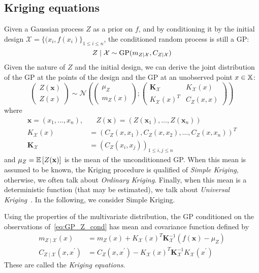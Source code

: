\documentclass[../../Main_ManuscritThese.tex]{subfiles}
\begin{document}
\subsection{Kriging equations}
\label{sec:linear_estimation}
Given a Gaussian process $Z$ as a prior on $f$, and by conditioning it by the initial design $\mathcal{X} = \{(x_i, f(x_i)\}_{1 \leq i \leq n}$, the conditioned random process is still a GP:
\begin{equation}
  \label{eq:GP_Z_cond}
  Z \mid \mathcal{X} \sim \operatorname{\mathrm{GP}}(m_{Z\mid \mathcal{X}}, C_{Z\mid \mathcal{X}})
\end{equation}
Given the nature of $Z$ and the initial design, we can derive the joint distribution of the GP at the points of the design and the GP at an unobserved point $x \in \mathbb{X}$:
\begin{equation}
  \label{eq:GP_joint_distrib}
  \begin{pmatrix}
    Z(\mathbf{x}) \\
    Z(x)
  \end{pmatrix} \sim
  \mathcal{N}\left(
    \begin{pmatrix}
      \mu_Z \\
      m_{Z}(x)
    \end{pmatrix} ;
    \begin{pmatrix}
      \mathbf{K}_{\mathcal{X}} & K_{\mathcal{X}}(x) \\
       K_{\mathcal{X}}(x)^T & C_Z(x, x)
    \end{pmatrix}
\right)
\end{equation}
where
\begin{align}
  \mathbf{x} = (x_1,\dots,x_n), &\quad Z(\mathbf{x}) = (Z(\mathbf{x}_1),\dots,Z(\mathbf{x}_n)) \\
  K_{\mathcal{X}}(x) &= \left(C_Z(x, x_1),C_Z(x, x_2),\dots,C_Z(x,x_n)\right)^T \\
  \mathbf{K}_{\mathcal{X}} &= \left(C_Z(x_i, x_j)\right)_{1 \leq i,j \leq n}
\end{align}
and $\mu_Z = \mathbb{E}\left[Z(\mathbf{x})\right]$ is the mean of the unconditionned GP. When this mean is assumed to be known, the Kriging procedure is qualified of \emph{Simple Kriging}, otherwise, we often talk about \emph{Ordinary Kriging}. Finally, when this mean is a deterministic function (that may be estimated), we talk about \emph{Universal Kriging}~\cite{le_riche_introduction_2014}. In the following, we consider Simple Kriging.

Using the properties of the multivariate distribution, the GP conditioned on the observations of~\eqref{eq:GP_Z_cond} has mean and covariance function defined by
\begin{align}
  m_{Z \mid \mathcal{X}}(x) &= m_Z(x) + K_{\mathcal{X}}(x)^T \mathbf{K}_{\mathcal{X}}^{-1}(f(\mathbf{x}) - \mu_Z ) \\
  C_{Z\mid \mathcal{X}}(x, x^\prime) &= C_Z(x, x^\prime)  - K_{\mathcal{X}}(x)^T\mathbf{K}_{\mathcal{X}}^{-1}K_{\mathcal{X}}(x^\prime)
\end{align}
These are called the \emph{Kriging equations}.
\end{document}
